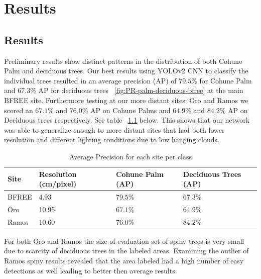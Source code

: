 
\chapter{Results} %

\label{Chapter5}


\section{Results}\label{section:results}

Preliminary results show distinct patterns in the distribution of both Cohune Palm and deciduous trees. Our best results using YOLOv2 CNN to classify the individual trees resulted in an average precision (AP) of $79.5\%$ for Cohune Palm and $67.3\%$ AP for deciduous trees ~\ref{fig:PR-palm-deciduous-bfree} at the main BFREE site. Furthermore testing at our more distant sites: Oro and Ramos we scored an $67.1\%$ and $76.0\%$ AP on Cohune Palms and $64.9\%$ and $84.2\%$ AP on Deciduous trees respectively. See table ~\ref{table:ap-results} below. This shows that our network was able to generalize enough to more distant sites that had both lower resolution and different lighting conditions due to low hanging clouds.

\begin{center}
    \begin{table}[h]\footnotesize
        \caption{Average Precision for each site per class}\label{table:ap-results}
        \begin{tabular}{| l | l | l | l |}
        \hline
        Site & Resolution (cm/pixel) & Cohune Palm (AP) & Deciduous Trees (AP)\\ \hline
        BFREE & 4.93  & $79.5\%$ & $67.3\%$ \\
        Oro   & 10.95 & $67.1\%$ & $64.9\%$ \\
        Ramos & 10.60 & $76.0\%$ & $84.2\%$ \\
        \hline
        \end{tabular}
    \end{table}
\end{center}

For both Oro and Ramos the size of evaluation set of spiny trees is very small due to scarcity of deciduous trees in the labeled areas. Examining the outlier of Ramos spiny results revealed that the area labeled had a high number of easy detections as well leading to better then average results.

